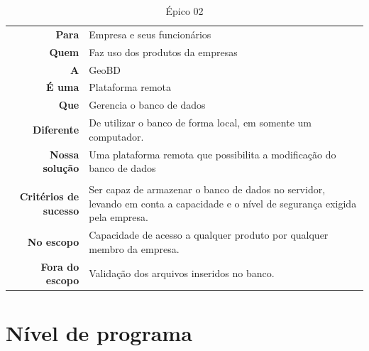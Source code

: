   \begin{table}[!htb]
    \centering
    \begin{tabular}{rp{10cm}}                 \hline
      \rowcolor{gray!50}
      \multicolumn{2}{c}{Criação de um servidor} \\ \hline
      \textbf{Para}                 & Empresa e seus funcionários                                                                   \\
      \textbf{Quem}                 & Faz uso dos produtos da empresas                                                              \\
      \textbf{A}                    & GeoBD                                                                                         \\
      \textbf{É uma}                & Plataforma remota                                                                             \\
      \textbf{Que}                  & Gerencia o banco de dados                                                                     \\
      \textbf{Diferente}            & De utilizar o banco de forma local, em somente um computador.                                 \\
      \textbf{Nossa solução}        & Uma plataforma remota que possibilita a modificação do banco de dados                         \\
      \rowcolor{gray!50} \hline
      \multicolumn{2}{c}{Escopo} \\ \hline
      \textbf{Critérios de sucesso} & Ser capaz de armazenar o banco de dados no servidor, levando em conta a capacidade e o nível
                                      de segurança exigida pela empresa.                                                            \\
      \textbf{No escopo}            & Capacidade de acesso a qualquer produto por qualquer membro da empresa.                       \\
      \textbf{Fora do escopo}       & Validação dos arquivos inseridos no banco.
    \end{tabular}
    \caption{Épico 02}
  \end{table}

\section{Nível de programa}

